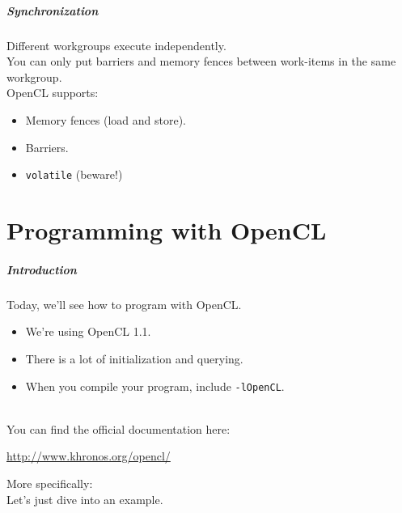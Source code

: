 \begin{frame}
  \frametitle{Synchronization}



Different workgroups execute independently.\\
You can only put barriers and memory fences between work-items in the
      same workgroup.\\[1em]

OpenCL supports:
  \begin{itemize}
    \item Memory fences (load and store).
    \item Barriers.
    \item {\tt volatile} (beware!)
  \end{itemize}

\end{frame}

\part{Programming with OpenCL}
\frame{\partpage}


\begin{frame}
  \frametitle{Introduction}



  Today, we'll see how to program with OpenCL.

  \begin{itemize}
    \item We're using OpenCL 1.1.
    \item There is a lot of initialization and querying.
    \item When you compile your program, include {\tt -lOpenCL}.
  \end{itemize}~\\[1em]

  You can find the official documentation here:

  \qquad \url{http://www.khronos.org/opencl/}

  More specifically:\\
  \vfill
  Let's just dive into an example.

\end{frame}

